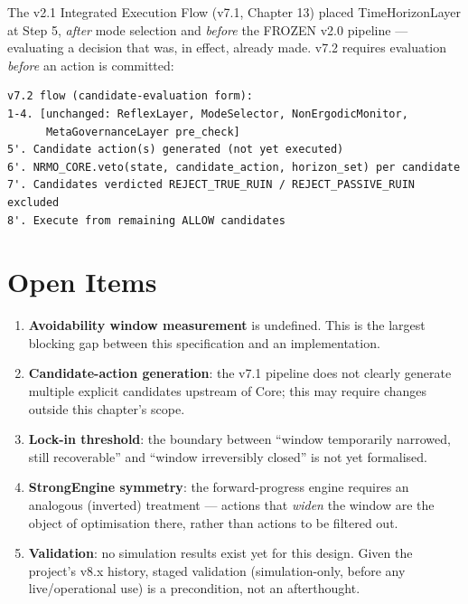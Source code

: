 The v2.1 Integrated Execution Flow (v7.1, Chapter 13) placed
TimeHorizonLayer at Step 5, \emph{after} mode selection and
\emph{before} the FROZEN v2.0 pipeline — evaluating a decision that
was, in effect, already made. v7.2 requires evaluation
\emph{before} an action is committed:

\begin{lstlisting}[basicstyle=\ttfamily\small,frame=single]
v7.2 flow (candidate-evaluation form):
1-4. [unchanged: ReflexLayer, ModeSelector, NonErgodicMonitor,
      MetaGovernanceLayer pre_check]
5'. Candidate action(s) generated (not yet executed)
6'. NRMO_CORE.veto(state, candidate_action, horizon_set) per candidate
7'. Candidates verdicted REJECT_TRUE_RUIN / REJECT_PASSIVE_RUIN excluded
8'. Execute from remaining ALLOW candidates
\end{lstlisting}


\section{Open Items}
\label{sec:time-horizon-open-items}

\begin{enumerate}
\item \textbf{Avoidability window measurement} is undefined. This is
the largest blocking gap between this specification and an
implementation.
\item \textbf{Candidate-action generation}: the v7.1 pipeline does
not clearly generate multiple explicit candidates upstream of Core;
this may require changes outside this chapter's scope.
\item \textbf{Lock-in threshold}: the boundary between ``window
temporarily narrowed, still recoverable'' and ``window irreversibly
closed'' is not yet formalised.
\item \textbf{StrongEngine symmetry}: the forward-progress engine
requires an analogous (inverted) treatment — actions that
\emph{widen} the window are the object of optimisation there, rather
than actions to be filtered out.
\item \textbf{Validation}: no simulation results exist yet for this
design. Given the project's v8.x history, staged validation
(simulation-only, before any live/operational use) is a
precondition, not an afterthought.
\end{enumerate}

